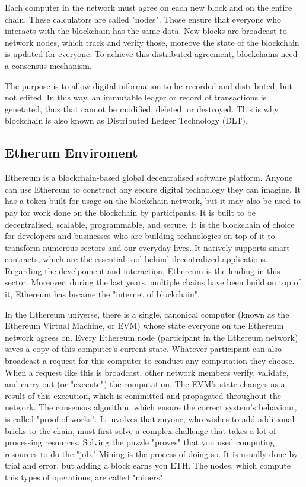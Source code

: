 \documentclass[a4paper,sigconf, language=french,
language=german, language=spanish, language=english]{acmart}
\begin{document}
Each computer in the network must agree on each new block and on the entire chain. 
These calculators are called "nodes". Those ensure that everyone who interacts with the blockchain has the same data. 
New blocks are broadcast to network nodes, which track and verify those, moreove the state of the blockchain is updated for everyone.
To achieve this distributed agreement, blockchains need a consensus mechanism. 

The purpose is to allow digital information to be recorded and distributed, but not edited. 
In this way, an immutable ledger or record of transactions is genetated, thus that cannot be modified, deleted, or destroyed. 
This is why blockchain is also known as Distributed Ledger Technology (DLT). 


\subsection{Etherum Enviroment}

Ethereum is a blockchain-based global decentralised software platform. 
Anyone can use Ethereum to construct any secure digital technology they can imagine.
It has a token built for usage on the blockchain network, but it may also be used to pay for work done on the blockchain by participants. 
It is built to be decentralised, scalable, programmable, and secure. It is the blockchain of choice for developers and businesses who are building technologies on top of it to transform numerous sectors and our everyday lives.
It natively supports smart contracts, which are the essential tool behind decentralized applications. Regarding the develpoment and interaction, Ethereum is the leading in this sector. 
Moreover, during the last years, multiple chains have been build on top of it, Ethereum has became the "internet of blockchain".

In the Ethereum universe, there is a single, canonical computer (known as the Ethereum Virtual Machine, or EVM) whose state everyone on the Ethereum network agrees on. 
Every Ethereum node (participant in the Ethereum network) saves a copy of this computer's current state. 
Whatever participant can also broadcast a request for this computer to conduct any computation they choose. 
When a request like this is broadcast, other network members verify, validate, and carry out (or "execute") the computation. 
The EVM's state changes as a result of this execution, which is committed and propagated throughout the network. The consensus algorithm, which ensure the correct system's behaviour, is called "proof of works". 
It involves that anyone, who wishes to add additional bricks to the chain, must first solve a complex challenge that takes a lot of processing resources.
Solving the puzzle "proves" that you used computing resources to do the "job."
Mining is the process of doing so. It is usually done by trial and error, but adding a block earns you ETH. The nodes, which compute this types of operations, are called "miners". 
\end{document}
